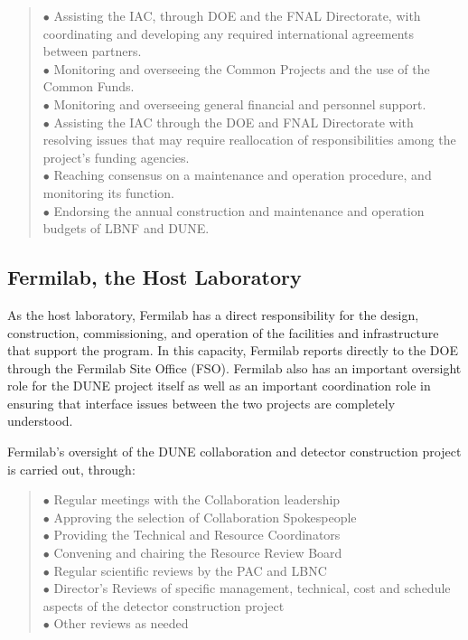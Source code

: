 \begin{quote}
$\bullet$ Assisting the IAC, through DOE and the FNAL Directorate,
with coordinating and developing any required international
agreements between partners.\\
$\bullet$ Monitoring and overseeing the Common Projects and the
use of the Common Funds.\\
$\bullet$ Monitoring and overseeing general financial and personnel support.\\
$\bullet$ Assisting the IAC through the DOE and FNAL Directorate
with resolving issues that may require reallocation of responsibilities
among the project’s funding agencies.\\
$\bullet$ Reaching consensus on a maintenance and operation procedure,
and monitoring its function.\\
$\bullet$ Endorsing the annual construction and maintenance and operation
budgets of LBNF and DUNE.\\
\end{quote}

\subsection{Fermilab, the Host Laboratory}

As the host laboratory, Fermilab has a direct responsibility for the design,
construction, commissioning, and operation of the facilities and
infrastructure that support the program.  In this capacity, Fermilab reports
directly to the DOE through the Fermilab Site Office (FSO).
Fermilab also has an important oversight role for the DUNE project
itself as well as an important coordination role in ensuring that
interface issues between the two projects are completely understood.

Fermilab's oversight of the DUNE collaboration and detector
construction project is carried out, through:
\begin{quote}
$\bullet$ Regular meetings with the Collaboration leadership\\
$\bullet$ Approving the selection of Collaboration Spokespeople\\
$\bullet$ Providing the Technical and Resource Coordinators\\
$\bullet$ Convening and chairing the Resource Review Board\\
$\bullet$ Regular scientific reviews by the PAC and LBNC\\
$\bullet$ Director’s Reviews of specific management, technical,
cost and schedule aspects of the detector construction project\\
$\bullet$ Other reviews as needed
\end{quote}

